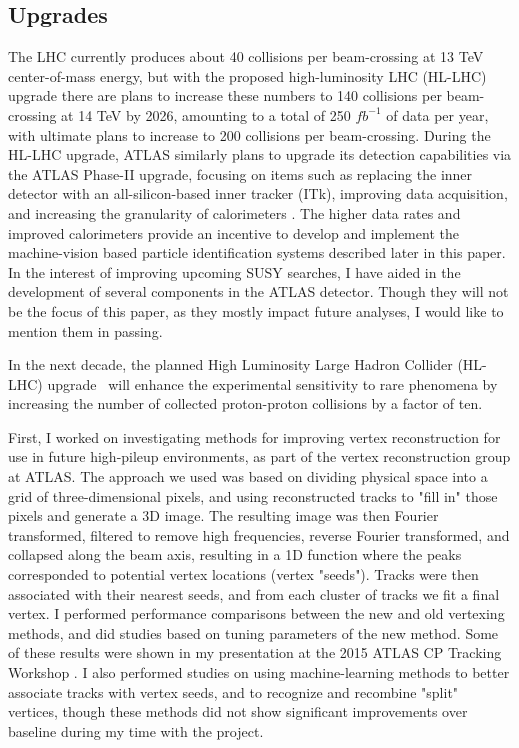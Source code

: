 \subsection*{Upgrades}

The LHC currently produces about 40 collisions per beam-crossing at 13 TeV center-of-mass energy, but with the proposed high-luminosity LHC (HL-LHC) upgrade there are plans to increase these numbers to 140 collisions per beam-crossing at 14 TeV by 2026, amounting to a total of 250 $fb^{-1}$ of data per year, with ultimate plans to increase to 200 collisions per beam-crossing. During the HL-LHC upgrade, ATLAS similarly plans to upgrade its detection capabilities via the ATLAS Phase-II upgrade, focusing on items such as replacing the inner detector with an all-silicon-based inner tracker (ITk), improving data acquisition, and increasing the granularity of calorimeters \cite{ATLAS_phaseII}. The higher data rates and improved calorimeters provide an incentive to develop and implement the machine-vision based particle identification systems described later in this paper. In the interest of improving upcoming SUSY searches, I have aided in the development of several components in the ATLAS detector. Though they will not be the focus of this paper, as they mostly impact future analyses, I would like to mention them in passing.

In the next decade, the planned High Luminosity Large Hadron Collider (HL-LHC) upgrade~\cite{Apollinari:2284929} will enhance
the experimental sensitivity to rare phenomena by increasing the number of collected proton-proton collisions by a factor of ten.

First, I worked on investigating methods for improving vertex reconstruction for use in future high-pileup environments, as part of the vertex reconstruction group at ATLAS. The approach we used was based on dividing physical space into a grid of three-dimensional pixels, and using reconstructed tracks to "fill in" those pixels and generate a 3D image. The resulting image was then Fourier transformed, filtered to remove high frequencies, reverse Fourier transformed, and collapsed along the beam axis, resulting in a 1D function where the peaks corresponded to potential vertex locations (vertex "seeds"). Tracks were then associated with their nearest seeds, and from each cluster of tracks we fit a final vertex. I performed performance comparisons between the new and old vertexing methods, and did studies based on tuning parameters of the new method. Some of these results were shown in my presentation at the 2015 ATLAS CP Tracking Workshop \cite{vertex}. I also performed studies on using machine-learning methods to better associate tracks with vertex seeds, and to recognize and recombine "split" vertices, though these methods did not show significant improvements over baseline during my time with the project.

